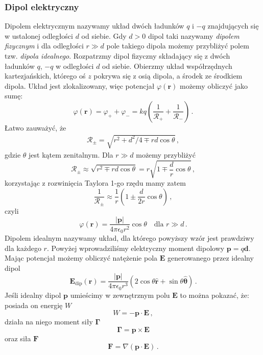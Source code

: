 \documentclass[../main.tex]{subfiles}
\begin{document}
\subsubsection{Dipol elektryczny}
Dipolem elektrycznym nazywamy układ dwóch ładunków \(q\) i \(-q\) znajdujących się w ustalonej odległości \(d\) od siebie. Gdy \(d>0\) dipol taki nazywamy \textit{dipolem fizycznym} i dla odległości \(r\gg d\) pole takiego dipola możemy przybliżyć polem tzw. \textit{dipola idealnego}. Rozpatrzmy dipol fizyczny składający się z dwóch ładunków \(q\), \(-q\) w odległości \(d\) od siebie. Obierzmy układ współrzędnych kartezjańskich, którego oś \(z\) pokrywa się z osią dipola, a środek ze środkiem dipola. Układ jest zlokalizowany, więc potencjał \(\varphi(\mathbf{r})\) możemy obliczyć jako sumę:
\begin{equation*}
    \varphi(\mathbf{r})=\varphi_++\varphi_-=kq\left(\frac{1}{\mathcal{R}_+}+\frac{1}{\mathcal{R}_-}\right)\,.
\end{equation*}
Łatwo zauważyć, że
\begin{equation*}
    \begin{split}
        \mathcal{R}_\pm=\sqrt{r^2+d^2/4\mp rd\cos\theta}\,,
    \end{split}
\end{equation*}
gdzie \(\theta\) jest kątem zenitalnym. Dla \(r\gg d\) możemy przybliżyć
\begin{equation*}
    \mathcal{R}_\pm\approx\sqrt{r^2\mp rd\cos\theta}=r\sqrt{1\mp\frac{d}{r}\cos\theta}\,,
\end{equation*}
korzystając z rozwinięcia Taylora 1-go rzędu mamy zatem
\begin{equation*}
    \frac{1}{\mathcal{R}_\pm}\approx \frac{1}{r}\left(1\pm\frac{d}{2r}\cos\theta\right)\,,
\end{equation*}
czyli
\begin{equation*}
    \varphi(\mathbf{r})=\frac{|\mathbf{p}|}{4\pi\epsilon_0r^2}\cos\theta\quad\text{dla \(r\gg d\)}\,.
\end{equation*}
Dipolem idealnym nazywamy układ, dla którego powyższy wzór jest prawdziwy dla każdego \(r\). Powyżej wprowadziliśmy elektryczny moment dipolowy \(\mathbf{p}=q\mathbf{d}\). Mając potencjał możemy obliczyć natężenie pola \(\mathbf{E}\) generowanego przez idealny dipol
\begin{equation*}
    \mathbf{E}_\text{dip}(\mathbf{r})=\frac{|\mathbf{p}|}{4\pi\epsilon_0r^3}(2\cos\theta\mathbf{\hat{r}}+\sin\theta\boldsymbol{\hat{\theta}})\,.
\end{equation*}
Jeśli idealny dipol \(\mathbf{p}\) umieścimy w zewnętrznym polu \(\mathbf{E}\) to można pokazać, że: posiada on energię \(W\)
\begin{equation*}
    W=-\mathbf{p}\cdot\mathbf{E}\,,
\end{equation*}
działa na niego moment siły \(\boldsymbol{\Gamma}\)
\begin{equation*}
    \boldsymbol{\Gamma}=\mathbf{p}\times\mathbf{E}
\end{equation*}
oraz siła \(\mathbf{F}\)
\begin{equation*}
    \mathbf{F}=\nabla(\mathbf{p\cdot\mathbf{E}})\,.
\end{equation*}
\end{document}
